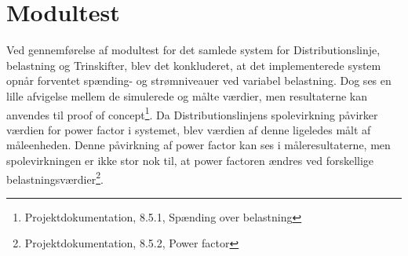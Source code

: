 
\section{Modultest}

Ved gennemførelse af modultest for det samlede system for Distributionslinje, belastning og Trinskifter, blev det konkluderet, at det implementerede system opnår forventet spænding- og strømniveauer ved variabel belastning. Dog ses en lille afvigelse mellem de simulerede og målte værdier, men resultaterne kan anvendes til proof of concept\footnote{Projektdokumentation, 8.5.1, Spænding over belastning}. Da Distributionslinjens spolevirkning påvirker værdien for power factor i systemet, blev værdien af denne ligeledes målt af måleenheden. Denne påvirkning af power factor kan ses i måleresultaterne, men spolevirkningen er ikke stor nok til, at power factoren ændres ved forskellige belastningsværdier\footnote{Projektdokumentation, 8.5.2, Power factor}. 
